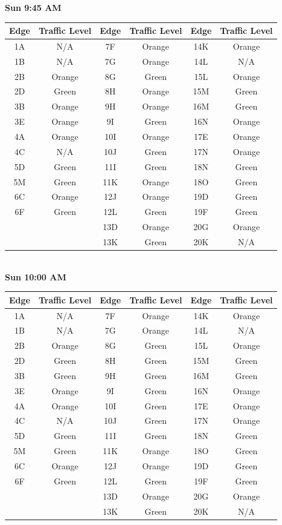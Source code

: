 \documentclass{article}
\begin{document}
\textbf{Sun 9:45 AM} \\

\begin{tabular}{|c|c||c|c||c|c|}\hline
Edge & Traffic Level & Edge & Traffic Level & Edge & Traffic Level \\ \hline
1A & N/A & 7F & Orange & 14K & Orange \\ 
1B & N/A & 7G & Orange & 14L & N/A \\ \hline
2B & Orange & 8G & Green & 15L & Orange \\ 
2D & Green & 8H & Orange & 15M & Green \\ \hline
3B & Orange & 9H & Orange & 16M & Green \\ 
3E & Orange & 9I & Green & 16N & Orange \\ \hline 
4A & Orange & 10I & Orange & 17E & Orange \\ 
4C & N/A & 10J & Green & 17N & Orange \\ \hline
5D & Green & 11I & Green & 18N & Green \\ 
5M & Green & 11K & Orange & 18O & Green \\ \hline 
6C & Orange & 12J & Orange & 19D & Green \\ 
6F & Green & 12L & Green & 19F & Green \\ \hline 
& & 13D & Orange & 20G & Orange \\
& & 13K & Green & 20K & N/A \\ \hline
\end{tabular} \\

\textbf{Sun 10:00 AM} \\

\begin{tabular}{|c|c||c|c||c|c|}\hline
Edge & Traffic Level & Edge & Traffic Level & Edge & Traffic Level \\ \hline
1A & N/A & 7F & Orange & 14K & Orange \\ 
1B & N/A & 7G & Orange & 14L & N/A \\ \hline
2B & Orange & 8G & Green & 15L & Orange \\ 
2D & Green & 8H & Green & 15M & Green \\ \hline
3B & Green & 9H & Green & 16M & Green \\ 
3E & Orange & 9I & Green & 16N & Orange \\ \hline 
4A & Orange & 10I & Green & 17E & Orange \\ 
4C & N/A & 10J & Green & 17N & Orange \\ \hline
5D & Green & 11I & Green & 18N & Green \\ 
5M & Green & 11K & Orange & 18O & Green \\ \hline 
6C & Orange & 12J & Orange & 19D & Green \\ 
6F & Green & 12L & Green & 19F & Green \\ \hline 
& & 13D & Orange & 20G & Orange \\
& & 13K & Green & 20K & N/A \\ \hline
\end{tabular} \\
\end{document}

